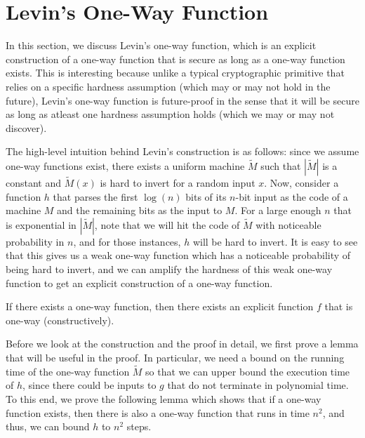 

\section{Levin's One-Way Function}
\label{sec:levin-owf}
In this section, we discuss Levin's one-way function, which is an explicit construction of a one-way function that is secure as long as a one-way function exists.
This is interesting because unlike a typical cryptographic primitive that relies on a specific hardness assumption (which may or may not hold in the future), Levin's one-way function is future-proof in the sense that it will be secure as long as atleast one hardness assumption holds (which we may or may not discover).

The high-level intuition behind Levin's construction is as follows: since we assume one-way functions exist, there exists a uniform machine $\tilde M$ such that $|\tilde M|$ is a constant and $\tilde M(x)$ is hard to invert for a random input $x$.
Now, consider a function $h$ that parses the first $\log(n)$ bits of its $n$-bit input as the code of a machine $M$ and the remaining bits as the input to $M$.
For a large enough $n$ that is exponential in $|\tilde{M}|$, note that we will hit the code of $\tilde{M}$ with noticeable probability in $n$, and for those instances, $h$ will be hard to invert.
It is easy to see that this gives us a weak one-way function which has a noticeable probability of being hard to invert, and we can amplify the hardness of this weak one-way function to get an explicit construction of a one-way function.

\begin{theorem}\label{thm:levin}
If there exists a one-way function, then there exists an explicit function $f$ that is one-way  (constructively).
\end{theorem}

Before we look at the construction and the proof in detail, we first prove a lemma that will be useful in the proof.
In particular, we need a bound on the running time of the one-way function $\tilde M$ so that we can upper bound the execution time of $h$, since there could be inputs to $g$ that do not terminate in polynomial time.
To this end, we prove the following lemma which shows that if a one-way function exists, then there is also a one-way function that runs in time $n^2$, and thus, we can bound $h$ to $n^2$ steps.

